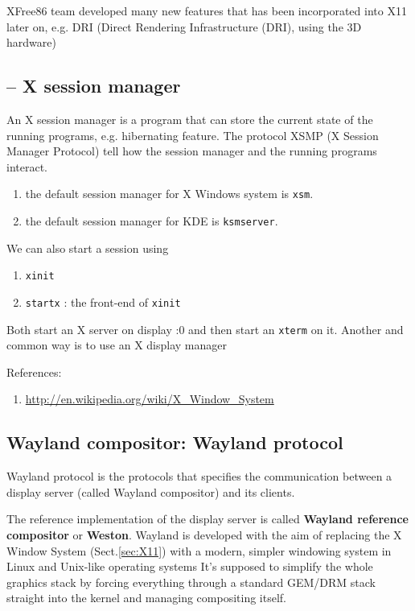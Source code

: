\begin{mdframed}
XFree86 team developed many new features that has been incorporated into X11
later on, e.g. DRI (Direct Rendering Infrastructure (DRI), using the 3D
hardware)
\end{mdframed}  

\subsection{-- X session manager}
\label{sec:X-session-manager}
\label{sec:xsm}
\label{sec:ksmserver}

An X session manager is a program that can store the current state of
the running programs, e.g. hibernating feature. The protocol XSMP (X
Session Manager Protocol) tell how the session manager and the running
programs interact.
\begin{enumerate}
\item the default session manager for X Windows system is \verb!xsm!. 
\item the default session manager for KDE is \verb!ksmserver!.
\end{enumerate}

We can also start a session using 
\begin{enumerate}
\item \verb!xinit!
\item \verb!startx! : the front-end of \verb!xinit!
\end{enumerate}
Both start an X server on display :0 and then start an \verb!xterm! on
it. Another and common way is to use an X display manager


References:
\begin{enumerate}
\item \url{http://en.wikipedia.org/wiki/X_Window_System}
\end{enumerate}

\subsection{Wayland compositor: Wayland protocol}
\label{sec:Wayland}

Wayland protocol is the protocols that specifies the communication between a
display server (called Wayland compositor) and its clients.

The reference implementation of the display server is called {\bf Wayland
reference compositor} or {\bf Weston}. Wayland is developed with the aim of
replacing the X Window System (Sect.\ref{sec:X11}) with a modern, simpler
windowing system in Linux and Unix-like operating systems It's supposed to
simplify the whole graphics stack by forcing everything through a standard
GEM/DRM stack straight into the kernel and managing compositing itself.



